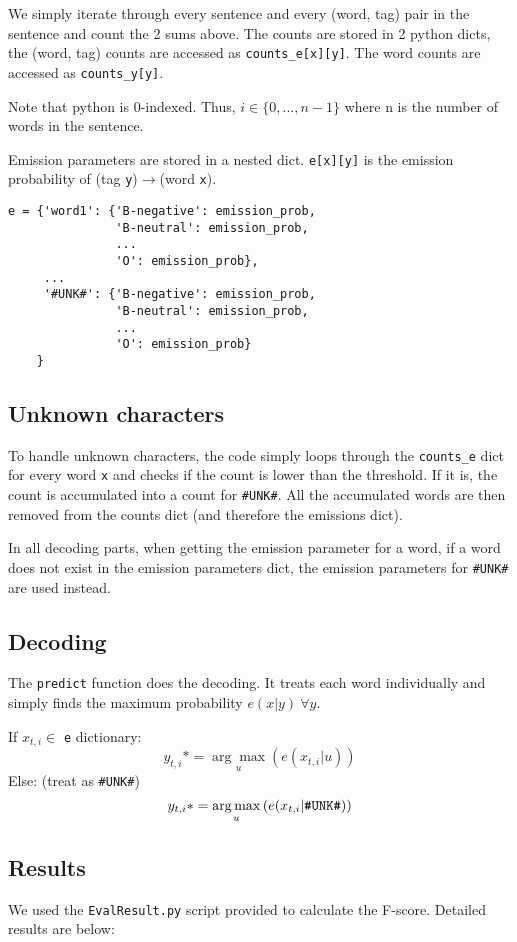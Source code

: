 \documentclass[12pt]{article}
\begin{document}
We simply iterate through every sentence and every (word, tag) pair in the sentence and count the 2 sums above.
The counts are stored in 2 python dicts, the (word, tag) counts are accessed as \verb|counts_e[x][y]|. The word counts are accessed as \verb|counts_y[y]|.

Note that python is 0-indexed. Thus, \(i \in \{0,...,n-1\}\) where n is the number of words in the sentence.

Emission parameters are stored in a nested dict. \verb|e[x][y]| is the emission probability of (tag \verb|y|)\(\rightarrow\)(word \verb|x|).

\begin{verbatim}
e = {'word1': {'B-negative': emission_prob,
               'B-neutral': emission_prob,
               ...
               'O': emission_prob},
     ...
     '#UNK#': {'B-negative': emission_prob,
               'B-neutral': emission_prob,
               ...
               'O': emission_prob}
    }
\end{verbatim}

\subsection{Unknown characters}

To handle unknown characters, the code simply loops through the \verb|counts_e| dict for every word \texttt{x} and checks if the count is lower than the threshold. If it is, the count is accumulated into a count for \verb|#UNK#|. All the accumulated words are then removed from the counts dict (and therefore the emissions dict).

In all decoding parts, when getting the emission parameter for a word, if a word does not exist in the emission parameters dict, the emission parameters for \verb|#UNK#| are used instead.

\subsection{Decoding}

The \texttt{predict} function does the decoding. It treats each word individually and simply finds the maximum probability \( e(x|y) \ \forall y \).

If \(x_{t,i} \in \) \verb|e| dictionary:
\[y_{t,i}* = \underset{u}{\arg\max} \left( e(x_{t,i}|u) \right) \]
Else: (treat as \verb|#UNK#|)
\[y_{t,i}* = \underset{u}{\arg\max} \left( e(x_{t,i}|\verb|#UNK#|) \right) \]

\subsection{Results}
We used the \texttt{EvalResult.py} script provided to calculate the F-score. Detailed results are below:
\end{document}
